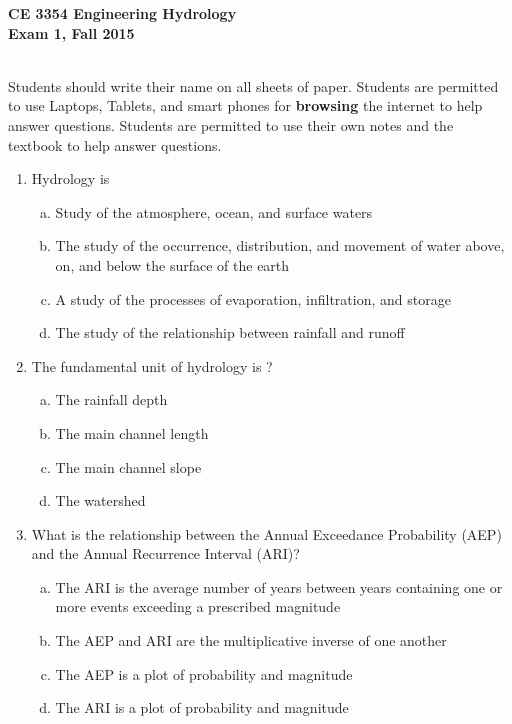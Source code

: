 \documentclass[12pt]{article}
\begin{document}
\begingroup
\begin{centering}
\textbf{CE 3354 Engineering Hydrology} \\
\textbf{Exam 1, Fall 2015}\\
\end{centering}
~\\
Students should write their name on all sheets of paper.  
Students are permitted to use Laptops, Tablets, and smart phones for \textbf{browsing} the internet to help answer questions.  Students are permitted to use their own notes and the textbook to help answer questions.
\endgroup
\begin{enumerate}
\item Hydrology is
\begin{enumerate}[a)]
\item Study of the atmosphere, ocean, and surface waters
\item The study of the occurrence, distribution, and movement of water above, on, and below the surface of the earth
\item A study of the processes of evaporation, infiltration, and storage
\item The study of the relationship between rainfall and runoff
\end{enumerate}
\item The fundamental unit of hydrology is ?
\begin{enumerate}[a)]
\item The rainfall depth
\item The main channel length
\item The main channel slope
\item The watershed 
\end{enumerate}
\item What is the relationship between the Annual Exceedance Probability (AEP) and the Annual Recurrence Interval (ARI)?
\begin{enumerate}[a)]
\item	The ARI is the average number of years between years containing one or more events exceeding a prescribed magnitude
\item	The AEP and ARI are the multiplicative inverse of one another
\item	The AEP is a plot of probability and magnitude
\item	The ARI is a plot of probability and magnitude
\end{enumerate}

\end{enumerate}
\end{document}
